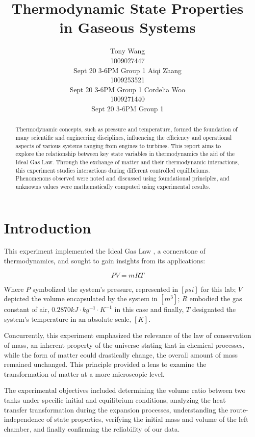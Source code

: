 \documentclass[12pt]{article}
\title{Thermodynamic State Properties in Gaseous Systems}
\author{
Tony Wang \\
1009027447\\
Sept 20 3-6PM Group 1
\And
Aiqi Zhang\\
1009253521\\
Sept 20 3-6PM Group 1
\And
Cordelia Woo\\
1009271440\\
Sept 20 3-6PM Group 1
}
\begin{document}
\maketitle

\begin{abstract}
Thermodynamic concepts, such as pressure and temperature, formed the foundation of many scientific and engineering disciplines, influencing the efficiency and operational aspects of various systems ranging from engines to turbines. This report aims to explore the relationship between key state variables in thermodynamics the aid of the Ideal Gas Law. Through the exchange of matter and their thermodynamic interactions, this experiment studies interactions during different controlled equilibriums. Phenomenons observed were noted and discussed using foundational principles, and unknowns values were mathematically computed using experimental results.
\end{abstract}
\section*{Introduction}
This experiment implemented the Ideal Gas Law \autocite{chandra2016energy}, a cornerstone of thermodynamics, and sought to gain insights from its applications:

\begin{equation}
P V = mRT 
\end{equation}

Where $P$ symbolized the system's pressure, represented in $[psi]$ for this lab; $V$ depicted the volume encapsulated by the system in $[m^3]$; $R$ embodied the gas constant of air, $0.2870kJ\cdot kg^{-1}\cdot K^{-1}$ in this case and finally, $T$ designated the system's temperature in an absolute scale, $[K]$. 

Concurrently, this experiment emphasized the relevance of the law of conservation of mass, an inherent property of the universe stating that in chemical processes, while the form of matter could drastically change, the overall amount of mass remained unchanged. This principle provided a lens to examine the transformation of matter at a more microscopic level. 

The experimental objectives included determining the volume ratio between two tanks under specific initial and equilibrium conditions, analyzing the heat transfer transformation during the expansion processes, understanding the route-independence of state properties, verifying the initial mass and volume of the left chamber, and finally confirming the reliability of our data. 
\end{document}
